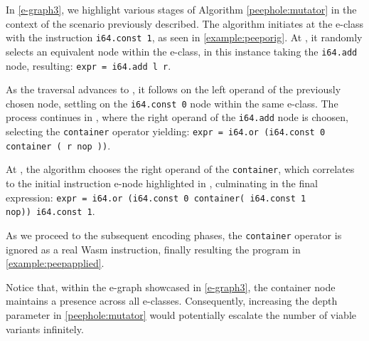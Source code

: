 In \autoref{e-graph3}, we highlight various stages of Algorithm \ref{peephole:mutator} in the context of the scenario previously described. 
The algorithm initiates at the e-class with the instruction \texttt{i64.const 1}, as seen in \autoref{example:peeporig}.
At , it randomly selects an equivalent node within the e-class, in this instance taking the \texttt{i64.add} node, resulting: {\texttt{expr = i64.add l r}}.

As the traversal advances to , it follows on the left operand of the previously chosen node, settling on the \texttt{i64.const 0} node within the same e-class.
The process continues in , where the right operand of the \texttt{i64.add} node is choosen, selecting the \texttt{container} operator yielding:
{\texttt{expr = i64.or (i64.const 0 container ( r nop ))}}.

At , the algorithm chooses the right operand of the \texttt{container}, which correlates to the initial instruction e-node highlighted in , culminating in the final expression:
{\texttt{expr = i64.or (i64.const 0 container( i64.const 1 nop))\ i64.const 1}}.

As we proceed to the subsequent encoding phases, the \texttt{container} operator is ignored as a real Wasm instruction, finally resulting the program in \autoref{example:peepapplied}.

Notice that, within the e-graph showcased in \autoref{e-graph3}, the container node maintains a presence across all e-classes. 
Consequently, increasing the depth parameter in \autoref{peephole:mutator} would potentially escalate the number of viable variants infinitely.

